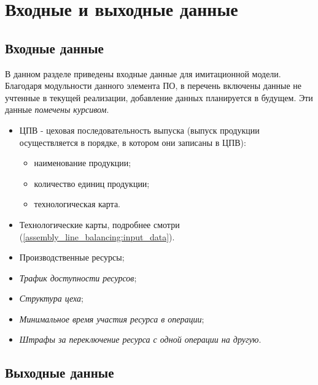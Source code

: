 \section{Входные и выходные данные}

\subsection{Входные данные}
В данном разделе приведены входные данные для имитационной модели. Благодаря модульности данного элемента ПО, в перечень включены данные не учтенные в текущей реализации, добавление данных планируется в будущем. Эти данные \textit{помечены курсивом}.

\begin{itemize}
	\item ЦПВ - цеховая последовательность выпуска (выпуск продукции осуществляется в порядке, в котором они записаны в ЦПВ):
		\begin{itemize}
			\item наименование продукции;
			\item количество единиц продукции;	
			\item технологическая карта.
		\end{itemize}			
	\item Технологические карты, подробнее смотри (\ref{assembly_line_balancing:input_data}).
	\item Производственные ресурсы;
	\item \textit{Трафик доступности ресурсов};
	\item \textit{Структура цеха};
	\item \textit{Минимальное время участия ресурса в операции};
	\item \textit{Штрафы за переключение ресурса с одной операции на другую}. 
\end{itemize}

\subsection{Выходные данные}

